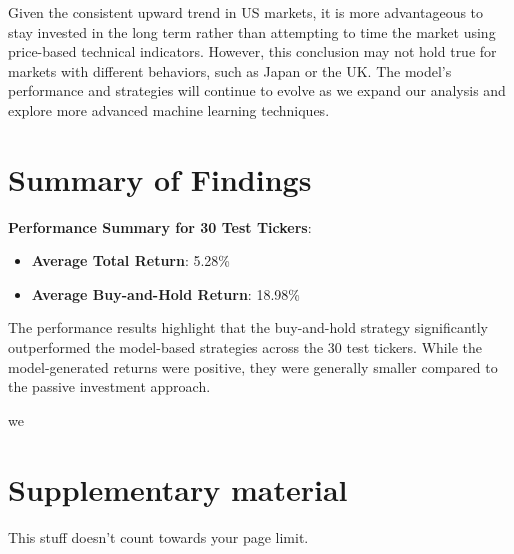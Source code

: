 \documentclass{article}
\begin{document}
Given the consistent upward trend in US markets, it is more advantageous to stay invested in the long term rather than attempting to time the market using price-based technical indicators. However, this conclusion may not hold true for markets with different behaviors, such as Japan or the UK. The model's performance and strategies will continue to evolve as we expand our analysis and explore more advanced machine learning techniques.

\section{Summary of Findings}

\textbf{Performance Summary for 30 Test Tickers}:
\begin{itemize}
    \item \textbf{Average Total Return}: 5.28\%
    \item \textbf{Average Buy-and-Hold Return}: 18.98\%
\end{itemize}

The performance results highlight that the buy-and-hold strategy significantly outperformed the model-based strategies across the 30 test tickers. While the model-generated returns were positive, they were generally smaller compared to the passive investment approach.

\printbibliography


we 
\appendix

\section{Supplementary material} \label{app:info}

This stuff doesn't count towards your page limit.
\end{document}
